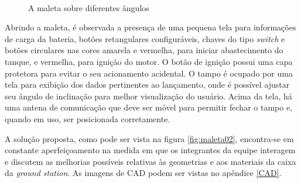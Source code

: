 \begin{figure} [H]
{  }
  \\ 
  \caption{A maleta sobre diferentes ângulos}
  \label{fig:maleta01}
\end{figure}

\par Abrindo a maleta, é observada a presença de uma pequena tela para informações de carga da bateria, botões retangulares configuráveis, chaves do tipo \textit{switch} e botões circulares nas cores amarela e vermelha, para iniciar abastecimento do tanque, e vermelha, para ignição do motor. O botão de ignição possui uma capa protetora para evitar o seu acionamento acidental. O tampo é ocupado por uma tela para exibição dos dados pertinentes ao lançamento, onde é possível ajustar seu ângulo de inclinação para melhor visualização do usuário. Acima da tela, há uma antena de comunicação que deve ser móvel para permitir fechar o tampo e, quando em uso, ser posicionada corretamente.

\par A solução proposta, como pode ser vista na figura \ref{fig:maleta02}, encontra-se em constante aperfeiçoamento na medida em que os integrantes da equipe interagem e discutem as melhorias possíveis relativas às geometrias e aos materiais da caixa da \textit{ground station}. As imagens de CAD podem ser vistas no apêndice \ref{CAD}.


